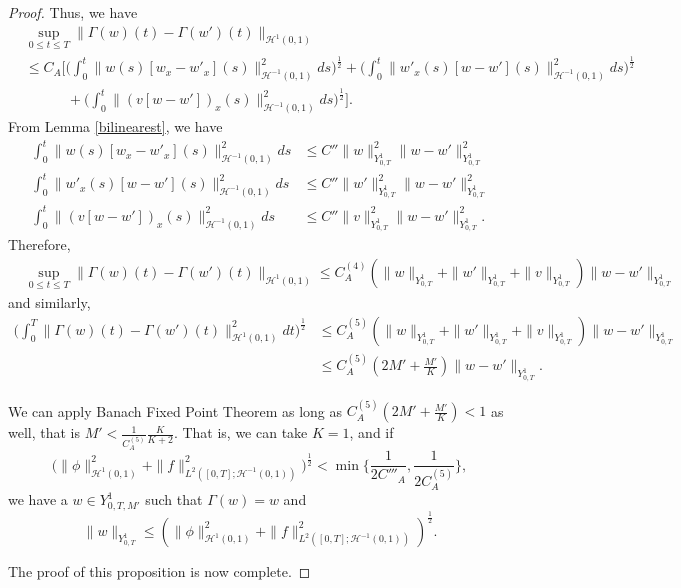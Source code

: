 \documentclass[10pt,a4paper,final]{article}
\numberwithin{equation}{section}
\newcommand{\cH}{\mathcal{H}}
\begin{document}
\begin{proof}
Thus, we have 
\begin{align*}
    &\sup_{0\leq t\leq T}\|\Gamma(w)(t)-\Gamma(w')(t)\|_{\cH^{1}(0,1)}\\
    &\leq C_A\bigg[\bigg(\int_0^t\|w(s)[w_x-w'_x](s)\|^2_{\cH^{-1}(0,1)}ds\bigg)^{\frac12}+\bigg(\int_0^t\|w'_x(s)[w-w'](s)\|^2_{\cH^{-1}(0,1)}ds\bigg)^{\frac12}\\
    &\quad\quad\quad +\bigg(\int_0^t\|(v[w-w'])_x(s)\|^2_{\cH^{-1}(0,1)}ds\bigg)^{\frac12}\bigg].
\end{align*}
From Lemma \ref{bilinearest}, we have 
\begin{align*}
    \int_0^t\|w(s)[w_x-w'_x](s)\|^2_{\cH^{-1}(0,1)}ds&\leq C'' \|w\|^2_{Y^{1}_{0,T}}\|w-w'\|^2_{Y^{1}_{0,T}}\\
    \int_0^t\|w'_x(s)[w-w'](s)\|^2_{\cH^{-1}(0,1)}ds&\leq C''\|w'\|^2_{Y^{1}_{0,T}}\|w-w'\|^2_{Y^{1}_{0,T}}\\
    \int_0^t\|(v[w-w'])_x(s)\|^2_{\cH^{-1}(0,1)}ds&\leq C''\|v\|_{Y^{1}_{0,T}}^2\|w-w'\|^2_{Y^{1}_{0,T}}.
\end{align*}
Therefore, 
\begin{align*}
    &\sup_{0\leq t\leq T}\|\Gamma(w)(t)-\Gamma(w')(t)\|_{\cH^{1}(0,1)}\leq C_A^{(4)}(\|w\|_{Y^{1}_{0,T}}+\|w'\|_{Y^{1}_{0,T}}+\|v\|_{Y^{1}_{0,T}})\|w-w'\|_{Y^{1}_{0,T}}
\end{align*}
and similarly, 
\begin{align*}
    \bigg(\int_0^T\|\Gamma(w)(t)-\Gamma(w')(t)\|_{\cH^{1}(0,1)}^2dt\bigg)^\frac{1}{2}&\leq C_A^{(5)}(\|w\|_{Y^{1}_{0,T}}+\|w'\|_{Y^{1}_{0,T}}+\|v\|_{Y^{1}_{0,T}})\|w-w'\|_{Y^{1}_{0,T}}\\
    &\leq C_A^{(5)} (2M'+\frac{M'}{K})\|w-w'\|_{Y^{1}_{0,T}}.
\end{align*}

We can apply Banach Fixed Point Theorem as long as $C_A^{(5)}(2M'+\frac{M'}{K})<1$ as well, that is $M'<\frac{1}{C_A^{(5)}}\frac{K}{K+2}.$ That is, we can take $K=1$, and if
$$\big(\|\phi\|_{\cH^1(0,1)}^2+\|f\|_{L^2([0,T];\cH^{-1}(0,1))}^2\big)^{\frac12}<\min\{ \frac{1}{2C'''_A}, \frac{1}{2C^{(5)}_A}\},$$
 we have a $w\in Y^{1}_{0,T,M'}$ such that $\Gamma(w)=w$ and 
$$\|w\|_{Y^{1}_{0,T}}\leq (\|\phi\|_{\cH^1(0,1)}^2+\|f\|^2_{L^2([0,T];\cH^{-1}(0,1))})^{\frac12}.$$

The proof of this proposition is now complete. 
\end{proof}
\end{document}
